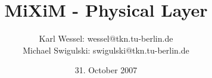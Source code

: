 \documentclass[10pt, a4paper]{article}
\begin{document}
\title{MiXiM - Physical Layer}
\author{Karl Wessel: wessel$@$tkn.tu-berlin.de\\
Michael Swigulski: swigulski$@$tkn.tu-berlin.de}
\date{31. October 2007}
\maketitle




\end{document}

